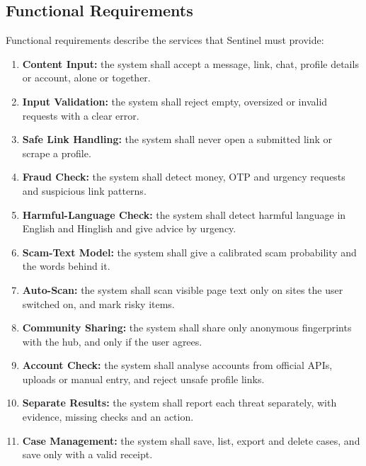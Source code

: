 \subsection{Functional Requirements}
\noindent Functional requirements describe the services that Sentinel must provide:
\begin{enumerate}
\item \textbf{Content Input:} the system shall accept a message, link, chat, profile details or account, alone or together.
\item \textbf{Input Validation:} the system shall reject empty, oversized or invalid requests with a clear error.
\item \textbf{Safe Link Handling:} the system shall never open a submitted link or scrape a profile.
\item \textbf{Fraud Check:} the system shall detect money, OTP and urgency requests and suspicious link patterns.
\item \textbf{Harmful-Language Check:} the system shall detect harmful language in English and Hinglish and give advice by urgency.
\item \textbf{Scam-Text Model:} the system shall give a calibrated scam probability and the words behind it.
\item \textbf{Auto-Scan:} the system shall scan visible page text only on sites the user switched on, and mark risky items.
\item \textbf{Community Sharing:} the system shall share only anonymous fingerprints with the hub, and only if the user agrees.
\item \textbf{Account Check:} the system shall analyse accounts from official APIs, uploads or manual entry, and reject unsafe profile links.
\item \textbf{Separate Results:} the system shall report each threat separately, with evidence, missing checks and an action.
\item \textbf{Case Management:} the system shall save, list, export and delete cases, and save only with a valid receipt.
\end{enumerate}

